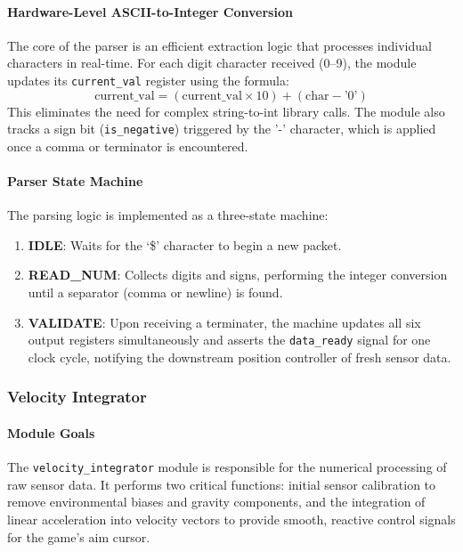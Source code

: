 \documentclass[12pt,a4paper]{article}
\begin{document}
\paragraph{Hardware-Level ASCII-to-Integer Conversion}
The core of the parser is an efficient extraction logic that processes individual characters in real-time. For each digit character received (0--9), the module updates its \texttt{current\_val} register using the formula:
\[ \text{current\_val} = (\text{current\_val} \times 10) + (\text{char} - \text{'0'}) \]
This eliminates the need for complex string-to-int library calls. The module also tracks a sign bit (\texttt{is\_negative}) triggered by the '-' character, which is applied once a comma or terminator is encountered.

\paragraph{Parser State Machine}
The parsing logic is implemented as a three-state machine:
\begin{enumerate}
    \item \textbf{IDLE}: Waits for the `\$' character to begin a new packet.
    \item \textbf{READ\_NUM}: Collects digits and signs, performing the integer conversion until a separator (comma or newline) is found.
    \item \textbf{VALIDATE}: Upon receiving a terminater, the machine updates all six output registers simultaneously and asserts the \texttt{data\_ready} signal for one clock cycle, notifying the downstream position controller of fresh sensor data.
\end{enumerate}

\subsubsection{Velocity Integrator}

\paragraph{Module Goals}
The \texttt{velocity\_integrator} module is responsible for the numerical processing of raw sensor data. It performs two critical functions: initial sensor calibration to remove environmental biases and gravity components, and the integration of linear acceleration into velocity vectors to provide smooth, reactive control signals for the game's aim cursor.
\end{document}

